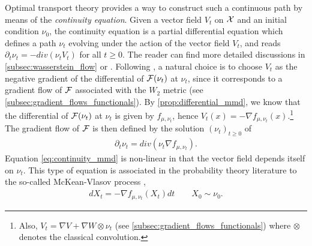 Optimal transport theory provides a way to construct such a continuous path by means of the \textit{continuity equation}. Given a vector field $V_t$ on ${{\mathcal X}}$ and an initial condition $\nu_0$, the continuity equation is a partial differential equation which defines a path $\nu_t$ evolving under the action of the vector field $V_t$, and reads $\partial_t \nu_t = -div(\nu_t V_t)$ for all $t \geq 0$.
The reader can find more detailed discussions in \cref{subsec:wasserstein_flow} or \cite{Santambrogio:2015}. Following  \cite{ambrosio2008gradient}, a natural choice is to choose $V_t$ as the negative gradient of the differential of ${{\mathcal F}}(\nu_t)$ at $\nu_t$, since it corresponds to a gradient flow of ${{\mathcal F}}$ associated with the $W_2$ metric (see \cref{subsec:gradient_flows_functionals}). %
By \cref{prop:differential_mmd}, we know that the differential of ${{\mathcal F}}(\nu_t)$  at $\nu_t$ is given by $f_{\mu,\nu_t}$, hence $V_t(x) = -\nabla f_{\mu,\nu_t}(x)$.\footnote{Also, $V_t=\nabla V+\nabla W \otimes \nu_t$ (see \cref{subsec:gradient_flows_functionals}) where $\otimes$ denotes the classical convolution.} The
gradient flow of ${{\mathcal F}}$ is then defined by the solution $(\nu_t)_{t\geq 0}$ of
\begin{align}\label{eq:continuity_mmd}
	\partial_t \nu_t = div(\nu_t \nabla f_{\mu,\nu_t}).
\end{align}
Equation \cref{eq:continuity_mmd} is non-linear in that the vector field depends itself on $\nu_t$. This type of equation is associated in the probability theory literature to the so-called McKean-Vlasov process \cite{kac1956foundations,mckean1966class},
\begin{align}\label{eq:mcKean_Vlasov_process}
	d X_t = -\nabla f_{\mu,\nu_t}(X_t)dt \qquad X_0\sim \nu_0.
\end{align}

